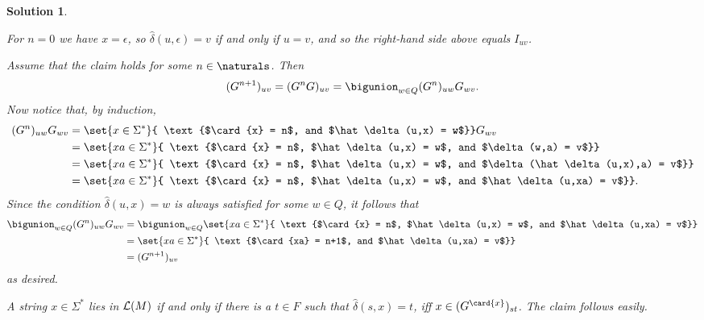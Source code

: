 \documentclass[article, a4paper, 11pt, oneside]{memoir}
\numberwithin{equation}{chapter}
\theoremstyle{nonumberplain}
\newtheorem{solution}{Solution}
\theoremstyle{myexample}
\theoremstyle{myexamplebreak}
\begin{document}
\begin{solution}
\begin{solutionsec}
    \item For $n = 0$ we have $x = \epsilon$, so $\hat\delta(u,\epsilon) = v$ if and only if $u = v$, and so the right-hand side above equals $I_{uv}$.
    
    Assume that the claim holds for some $n \in \naturals$. Then
    \begin{equation*}
        (G^{n+1})_{uv}
            = (G^n G)_{uv}
            = \bigunion_{w \in Q} (G^n)_{uw} G_{wv}.
    \end{equation*}
    Now notice that, by induction,
    \begin{align*}
        (G^n)_{uw} G_{wv}
            &= \set{x \in \Sigma^*}{ \text{$\card{x} = n$, and $\hat\delta(u,x) = w$}} G_{wv} \\
            &= \set{xa \in \Sigma^*}{ \text{$\card{x} = n$, $\hat\delta(u,x) = w$, and $\delta(w,a) = v$}} \\
            &= \set{xa \in \Sigma^*}{ \text{$\card{x} = n$, $\hat\delta(u,x) = w$, and $\delta(\hat\delta(u,x),a) = v$}} \\
            &= \set{xa \in \Sigma^*}{ \text{$\card{x} = n$, $\hat\delta(u,x) = w$, and $\hat\delta(u,xa) = v$}}.
    \end{align*}
    Since the condition $\hat\delta(u,x) = w$ is always satisfied for some $w \in Q$, it follows that
    \begin{align*}
        \bigunion_{w \in Q} (G^n)_{uw} G_{wv}
            &= \bigunion_{w \in Q} \set{xa \in \Sigma^*}{ \text{$\card{x} = n$, $\hat\delta(u,x) = w$, and $\hat\delta(u,xa) = v$}} \\
            &= \set{xa \in \Sigma^*}{ \text{$\card{xa} = n+1$, and $\hat\delta(u,xa) = v$}} \\
            &= (G^{n+1})_{uv}
    \end{align*}
    as desired.

    \item A string $x \in \Sigma^*$ lies in $\mathcal{L}(M)$ if and only if there is a $t \in F$ such that $\hat\delta(s,x) = t$, iff $x \in (G^{\card{x}})_{st}$. The claim follows easily.
\end{solutionsec}
\end{solution}


\newcommand{\Bepsilon}{\bm{\epsilon}}
\end{document}
